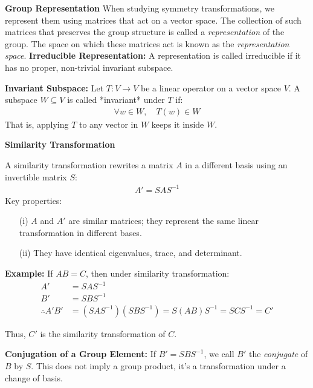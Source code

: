\documentclass[14pt]{article} %
\begin{document}
\begin{tcolorbox}[ title=\textbf{Notes:}]
\textbf{Group Representation}
\vspace{0.1cm}
\newline
When studying symmetry transformations, we represent them using matrices that act on a vector space.  
The collection of such matrices that preserves the group structure is called a \textit{representation} of the group.  
The space on which these matrices act is known as the \textit{representation space}.
\vspace{0.1cm}
\newline
\textbf{Irreducible Representation:}  
A representation is called irreducible if it has no proper, non-trivial invariant subspace.

\vspace{0.1cm}
\textbf{Invariant Subspace:}  
Let $T: V \rightarrow V$ be a linear operator on a vector space $V$. A subspace $W \subseteq V$ is called *invariant* under $T$ if:
\begin{align*}
\forall w \in W,\quad T(w) \in W
\end{align*}
That is, applying $T$ to any vector in $W$ keeps it inside $W$.

\vspace{0.3cm}
\textbf{Similarity Transformation}

A similarity transformation rewrites a matrix $A$ in a different basis using an invertible matrix $S$:
\begin{align*}
A' = S A S^{-1}
\end{align*}
Key properties:
\begin{itemize}
    \item[(i)] $A$ and $A'$ are similar matrices; they represent the same linear transformation in different bases.
    \item[(ii)] They have identical eigenvalues, trace, and determinant.
\end{itemize}
\textbf{Example:} If $AB = C$, then under similarity transformation:
\begin{align*}
A'& =SAS^{-1} \\
B' &= SBS^{-1} \\
    \therefore A'B' &= (SAS^{-1})(SBS^{-1}) = S(AB)S^{-1} = SCS^{-1} = C'
\end{align*}

Thus, $C'$ is the similarity transformation of $C$.
\vspace{0.3cm}
\end{tcolorbox}
\begin{tcolorbox}
\textbf{Conjugation of a Group Element:}
\newline
If $B' = SBS^{-1}$, we call $B'$ the \textit{conjugate} of $B$ by $S$.
This does not imply a group product, it’s a transformation under a change of basis.
\end{tcolorbox}
\end{document}
